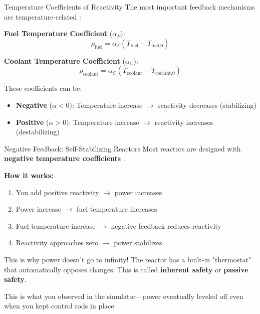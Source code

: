 \documentclass[aspectratio=169]{beamer}
\begin{document}
\begin{frame}[allowframebreaks]{Temperature Coefficients of Reactivity}
    The most important feedback mechanisms are temperature-related \cite{lamarsh2001introduction}:

    \vspace{1em}
    \textbf{Fuel Temperature Coefficient} ($\alpha_F$):
    $$ \rho_{\text{fuel}} = \alpha_F (T_{\text{fuel}} - T_{\text{fuel,0}}) $$

    \textbf{Coolant Temperature Coefficient} ($\alpha_C$):
    $$ \rho_{\text{coolant}} = \alpha_C (T_{\text{coolant}} - T_{\text{coolant,0}}) $$

    \vspace{1em}
    These coefficients can be:
    \begin{itemize}
        \item \textbf{Negative} ($\alpha < 0$): Temperature increase $\rightarrow$ reactivity decreases (stabilizing)
        \item \textbf{Positive} ($\alpha > 0$): Temperature increase $\rightarrow$ reactivity increases (destabilizing)
    \end{itemize}
\end{frame}

\begin{frame}[allowframebreaks]{Negative Feedback: Self-Stabilizing Reactors}
    Most reactors are designed with \textbf{negative temperature coefficients} \cite{bell1970nuclear}.

    \vspace{1em}
    \textbf{How it works:}
    \begin{enumerate}
        \item You add positive reactivity $\rightarrow$ power increases
        \item Power increase $\rightarrow$ fuel temperature increases
        \item Fuel temperature increase $\rightarrow$ negative feedback reduces reactivity
        \item Reactivity approaches zero $\rightarrow$ power stabilizes
    \end{enumerate}

    \vspace{1em}
    \begin{block}{This is why power doesn't go to infinity!}
        The reactor has a built-in "thermostat" that automatically opposes changes. This is called \textbf{inherent safety} or \textbf{passive safety}.
    \end{block}

    \vspace{1em}
    This is what you observed in the simulator—power eventually leveled off even when you kept control rods in place.
\end{frame}
\end{document}

